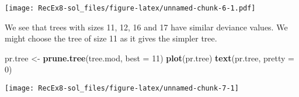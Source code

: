 \documentclass[
]{article}
\newenvironment{Shaded}{\begin{snugshade}}{\end{snugshade}}
\newcommand{\AttributeTok}[1]{\textcolor[rgb]{0.13,0.29,0.53}{#1}}
\newcommand{\DecValTok}[1]{\textcolor[rgb]{0.00,0.00,0.81}{#1}}
\newcommand{\FunctionTok}[1]{\textcolor[rgb]{0.13,0.29,0.53}{\textbf{#1}}}
\newcommand{\NormalTok}[1]{#1}
\newcommand{\OtherTok}[1]{\textcolor[rgb]{0.56,0.35,0.01}{#1}}
\newcommand{\SpecialCharTok}[1]{\textcolor[rgb]{0.81,0.36,0.00}{\textbf{#1}}}
\newcommand{\StringTok}[1]{\textcolor[rgb]{0.31,0.60,0.02}{#1}}
\begin{document}
\begin{Shaded}
\end{Shaded}

\texttt{[image: RecEx8-sol\_files/figure-latex/unnamed-chunk-6-1.pdf]}

We see that trees with sizes 11, 12, 16 and 17 have similar deviance
values. We might choose the tree of size 11 as it gives the simpler
tree.

\begin{Shaded}
\begin{Highlighting}[]
\NormalTok{pr.tree }\OtherTok{\textless{}{-}} \FunctionTok{prune.tree}\NormalTok{(tree.mod, }\AttributeTok{best =} \DecValTok{11}\NormalTok{)}
\FunctionTok{plot}\NormalTok{(pr.tree)}
\FunctionTok{text}\NormalTok{(pr.tree, }\AttributeTok{pretty =} \DecValTok{0}\NormalTok{)}
\end{Highlighting}
\end{Shaded}

\texttt{[image: RecEx8-sol\_files/figure-latex/unnamed-chunk-7-1]}

\begin{Shaded}
\end{Shaded}
\end{document}
